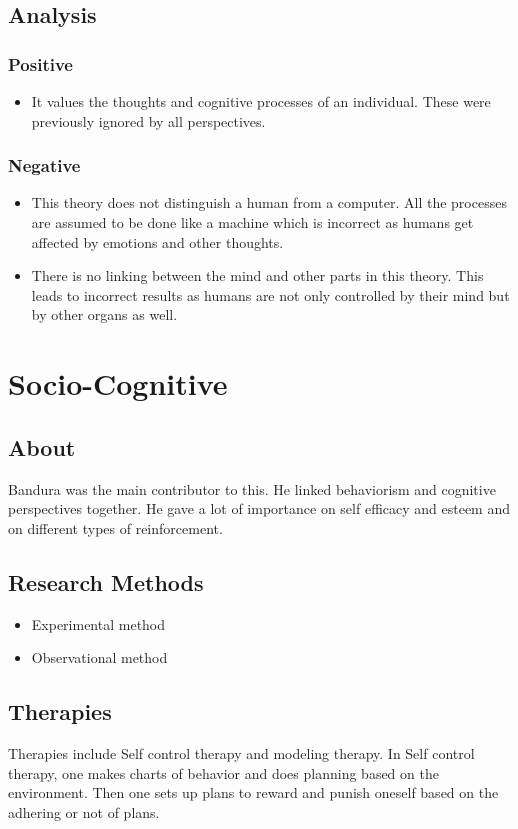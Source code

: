 \documentclass{article}
\begin{document}
		\subsection{Analysis}
			\subsubsection{Positive}
				\begin{itemize}
					\item It values the thoughts and cognitive processes of an individual. These were previously ignored by all perspectives.
				\end{itemize}
			\subsubsection{Negative}
				\begin{itemize}
					\item This theory does not distinguish a human from a computer. All the processes are assumed to be done like a machine which is incorrect as humans get affected by emotions and other thoughts.
					\item There is no linking between the mind and other parts in this theory. This leads to incorrect results as humans are not only controlled by their mind but by other organs as well.
				\end{itemize}

	\section{Socio-Cognitive}
		\subsection{About}
		Bandura was the main contributor to this.
		He linked behaviorism and cognitive perspectives together.
		\newline
		He gave a lot of importance on self efficacy and esteem and on different types of reinforcement.
		\subsection{Research Methods}
			\begin{itemize}
				\item Experimental method
				\item Observational method
			\end{itemize}
		\subsection{Therapies}
			Therapies include Self control therapy and modeling therapy.
			\newline
			In Self control therapy, one makes charts of behavior and does planning based on the environment. Then one sets up plans to reward and punish oneself based on the adhering or not of plans.
\end{document}
